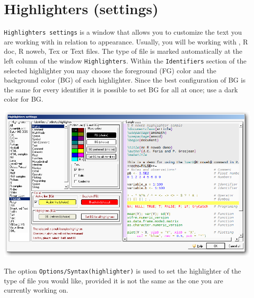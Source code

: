 
\section{Highlighters (settings)}

\texttt{Highlighters settings} is a window that allows you to customize the text you are working with in relation to appearance.
Usually, you will be working with \RR{}, R doc, R noweb, Tex or Text files.
The type of file is marked automatically at the left column of the window \texttt{Highlighters}.
Within the \texttt{Identifiers} section of the selected highlighter you may choose the foreground (FG)
color and the background color (BG) of each highlighter. Since the best configuration of BG is the same for every
identifier it is possible to set BG for all at once; use a dark color for BG.

\includegraphics[scale=0.50]{./res/highlighter_settings.png}

The option \texttt{Options/Syntax(highlighter)} is used to set the highlighter of the type of file you would like,
provided it is not the same as the one you are currently working on.
